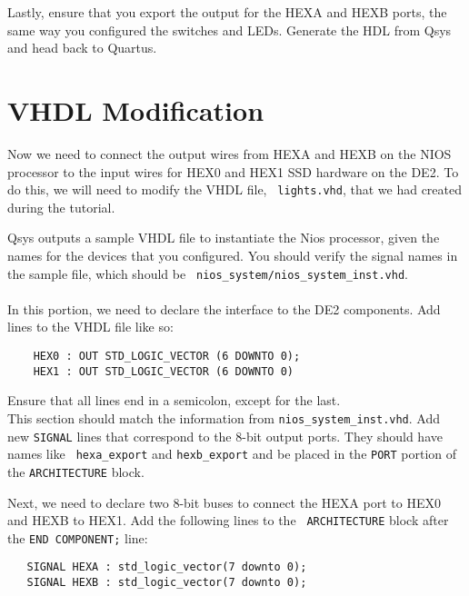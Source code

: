 \documentclass[10pt]{article}
\begin{document}
Lastly, ensure that you export the output for the HEXA and HEXB ports,
the same way you configured the switches and LEDs. Generate the HDL
from Qsys and head back to Quartus.

\section{VHDL Modification}

Now we need to connect the output wires from HEXA and HEXB on the NIOS
processor to the input wires for HEX0 and HEX1 SSD hardware on the
DE2. To do this, we will need to modify the VHDL file, {\tt
  lights.vhd}, that we had created during the tutorial.

\noindent Qsys outputs a sample VHDL file to instantiate the Nios processor,
given the names for the devices that you configured. You should verify
the signal names in the sample file, which should be {\tt
  nios\_system/nios\_system\_inst.vhd}.\\

\\

  In this portion, we need to declare the interface
to the DE2 components. Add lines to the VHDL file like so:

\begin{verbatim}
    HEX0 : OUT STD_LOGIC_VECTOR (6 DOWNTO 0);
    HEX1 : OUT STD_LOGIC_VECTOR (6 DOWNTO 0)
\end{verbatim}

Ensure that all lines end in a semicolon, except for the last. \\

  This section should match the information
from {\tt nios\_system\_inst.vhd}. Add new {\tt SIGNAL} lines that
correspond to the 8-bit output ports. They should have names like {\tt
  hexa\_export} and {\tt hexb\_export} and be placed in the {\tt PORT}
portion of the {\tt ARCHITECTURE} block.

Next, we need to declare two 8-bit buses to connect the HEXA port to
HEX0 and HEXB to HEX1. Add the following lines to the {\tt
  ARCHITECTURE} block after the {\tt END COMPONENT;} line:

\begin{verbatim}
   SIGNAL HEXA : std_logic_vector(7 downto 0);
   SIGNAL HEXB : std_logic_vector(7 downto 0);
\end{verbatim}
\end{document}
